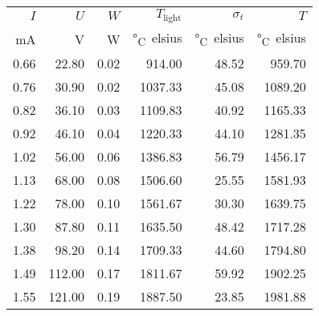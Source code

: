 \begin{table}[H]
\begin{tabular}{rrrrrr}
\toprule
$I$ & $U$ & $W$ & $T_\text{light}$ & $\sigma_t$ & $T$ \\
\si[]{\milli\ampere} & \si[]{\volt} & \si[]{\watt} & \si[]{\degree_Celsius} & \si[]{\degree_Celsius} & \si[]{\degree_Celsius} \\
\midrule
0.66 & 22.80 & 0.02 & 914.00 & 48.52 & 959.70 \\
0.76 & 30.90 & 0.02 & 1037.33 & 45.08 & 1089.20 \\
0.82 & 36.10 & 0.03 & 1109.83 & 40.92 & 1165.33 \\
0.92 & 46.10 & 0.04 & 1220.33 & 44.10 & 1281.35 \\
1.02 & 56.00 & 0.06 & 1386.83 & 56.79 & 1456.17 \\
1.13 & 68.00 & 0.08 & 1506.60 & 25.55 & 1581.93 \\
1.22 & 78.00 & 0.10 & 1561.67 & 30.30 & 1639.75 \\
1.30 & 87.80 & 0.11 & 1635.50 & 48.42 & 1717.28 \\
1.38 & 98.20 & 0.14 & 1709.33 & 44.60 & 1794.80 \\
1.49 & 112.00 & 0.17 & 1811.67 & 59.92 & 1902.25 \\
1.55 & 121.00 & 0.19 & 1887.50 & 23.85 & 1981.88 \\
\bottomrule
\end{tabular}
\end{table}
